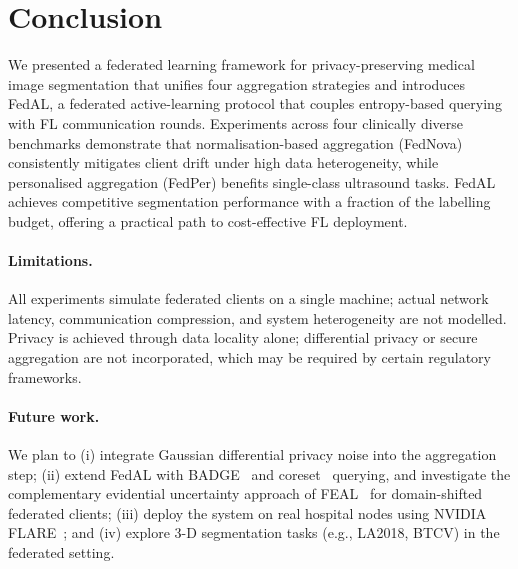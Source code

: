\section{Conclusion}
\label{sec:conclusion}

We presented a federated learning framework for privacy-preserving medical
image segmentation that unifies four aggregation strategies and introduces
FedAL, a federated active-learning protocol that couples entropy-based
querying with FL communication rounds.
Experiments across four clinically diverse benchmarks demonstrate that
normalisation-based aggregation (FedNova) consistently mitigates client
drift under high data heterogeneity, while personalised aggregation
(FedPer) benefits single-class ultrasound tasks.
FedAL achieves competitive segmentation performance with a fraction of the
labelling budget, offering a practical path to cost-effective FL deployment.

\paragraph{Limitations.}
All experiments simulate federated clients on a single machine; actual
network latency, communication compression, and system heterogeneity are
not modelled.
Privacy is achieved through data locality alone; differential privacy or
secure aggregation are not incorporated, which may be required by certain
regulatory frameworks.

\paragraph{Future work.}
We plan to (i) integrate Gaussian differential privacy noise into the
aggregation step; (ii) extend FedAL with BADGE~\cite{ash2020badge} and
coreset~\cite{sener2018coreset} querying, and investigate the complementary
evidential uncertainty approach of FEAL~\cite{chen2024feal} for
domain-shifted federated clients; (iii) deploy
the system on real hospital nodes using NVIDIA FLARE~\cite{nvidia2019clara};
and (iv) explore 3-D segmentation tasks (e.g., LA2018, BTCV) in the
federated setting.
